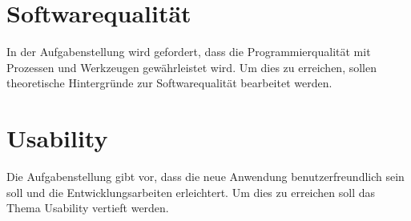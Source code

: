 \section{Softwarequalität}
In der Aufgabenstellung wird gefordert, dass die Programmierqualität mit Prozessen und Werkzeugen gewährleistet wird.
Um dies zu erreichen, sollen theoretische Hintergründe zur Softwarequalität bearbeitet werden. 

\section{Usability}
Die Aufgabenstellung gibt vor, dass die neue Anwendung benutzerfreundlich sein soll und die Entwicklungsarbeiten erleichtert.
Um dies zu erreichen soll das Thema Usability vertieft werden.